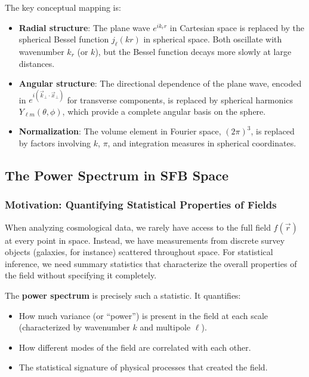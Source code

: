 The key conceptual mapping is:
\begin{itemize}
    \item \textbf{Radial structure}: The plane wave $e^{i k_r r}$ in Cartesian space is replaced by the spherical Bessel function $j_\ell(kr)$ in spherical space. Both oscillate with wavenumber $k_r$ (or $k$), but the Bessel function decays more slowly at large distances.
    \item \textbf{Angular structure}: The directional dependence of the plane wave, encoded in $e^{i(\vec{k}_\perp \cdot \vec{x}_\perp)}$ for transverse components, is replaced by spherical harmonics $Y_{\ell m}(\theta, \phi)$, which provide a complete angular basis on the sphere.
    \item \textbf{Normalization}: The volume element in Fourier space, $(2\pi)^3$, is replaced by factors involving $k$, $\pi$, and integration measures in spherical coordinates.
\end{itemize}

\subsection{The Power Spectrum in SFB Space}

\subsubsection{Motivation: Quantifying Statistical Properties of Fields}

When analyzing cosmological data, we rarely have access to the full field $f(\vec{r})$ at every point in space. Instead, we have measurements from discrete survey objects (galaxies, for instance) scattered throughout space. For statistical inference, we need summary statistics that characterize the overall properties of the field without specifying it completely.

The \textbf{power spectrum} is precisely such a statistic. It quantifies:
\begin{itemize}
    \item How much variance (or ``power'') is present in the field at each scale (characterized by wavenumber $k$ and multipole $\ell$).
    \item How different modes of the field are correlated with each other.
    \item The statistical signature of physical processes that created the field.
\end{itemize}

